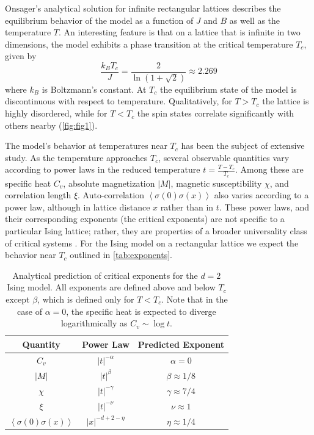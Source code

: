 \documentclass[letter,scriptaddress,twocolumn, prl,nofootinbib]{revtex4}
\newcommand{\submin}[1]{\left\langle #1 \right\rangle}
\begin{document}
Onsager's analytical solution for infinite rectangular lattices \cite{Onsager} describes the equilibrium behavior of the model as a function of $J$ and $B$ as well as the temperature $T$. An interesting feature is that on a lattice that is infinite in two dimensions, the model exhibits a phase transition at the critical temperature $T_c$, given by
\begin{equation}
	\label{eq:Tc}
	\frac{k_B T_c}{J} = \frac{2}{\ln{(1+\sqrt{2})}} \approx 2.269
\end{equation}
where $k_B$ is Boltzmann's constant. At $T_c$ the equilibrium state of the model is discontinuous with respect to temperature. Qualitatively, for $T > T_c$ the lattice is highly disordered, while for $T < T_c$ the spin states correlate significantly with others nearby (\autoref{fig:fig1}).

The model's behavior at temperatures near $T_c$ has been the subject of extensive study. As the temperature approaches $T_c$, several observable quantities vary according to power laws in the reduced temperature $t = \frac{T - T_c}{T_c}$. Among these are specific heat $C_v$, absolute magnetization $|M|$, magnetic susceptibility $\chi$, and correlation length $\xi$. Auto-correlation $\submin{\sigma(0)\sigma(x)}$ also varies according to a power law, although in lattice distance $x$ rather than in $t$. These power laws, and their corresponding exponents (the critical exponents) are not specific to a particular Ising lattice; rather, they are properties of a broader universality class of critical systems \cite{Stanley}. For the Ising model on a rectangular lattice we expect the behavior near $T_c$ outlined in \autoref{tab:exponents}.

\begin{table}[h]
	\begin{center}
		\begin{tabular}{|c|c|c|}
			\hline
	Quantity & Power Law & Predicted Exponent \\
			\hline
			$C_v$ & $|t|^{-\alpha}$ & $\alpha = 0$ \\
			$|M|$ & $|t|^\beta$ & $\beta \approx 1/8$ \\
			$\chi$ & $|t|^{-\gamma}$ & $\gamma \approx 7/4$ \\
			$\xi$ & $|t|^{-\nu}$ & $\nu \approx 1$ \\
			$\submin{\sigma(0)\sigma(x)}$ & $|x|^{-d + 2 - \eta}$ & $ \eta \approx 1/4$ \\
			\hline
		\end{tabular}
		\caption{Analytical prediction of critical exponents for the $d = 2$ Ising model. All exponents are defined above and below $T_c$ except $\beta$, which is defined only for $T < T_c$. Note that in the case of $\alpha = 0$, the specific heat is expected to diverge logarithmically as $C_v \sim \log t$.}
		\label{tab:exponents}
	\end{center}
 \end{table}
\end{document}

